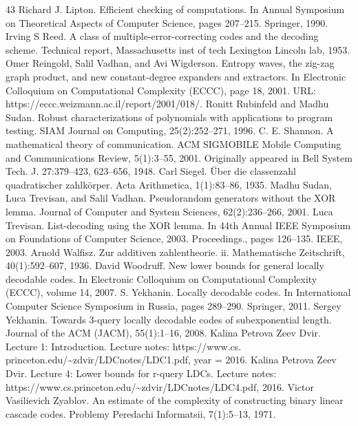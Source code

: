\documentclass[10pt,a4paper]{article}
\begin{document}
\begin{thebibliography}{43}
Richard J. Lipton. Efficient checking of computations. In Annual Symposium on Theoretical Aspects of Computer Science, pages 207–215. Springer, 1990.
Irving S Reed. A class of multiple-error-correcting codes and the decoding scheme. Technical report, Massachusetts inst of tech Lexington Lincoln lab, 1953.
Omer Reingold, Salil Vadhan, and Avi Wigderson. Entropy waves, the zig-zag graph product, and new constant-degree expanders and extractors. In Electronic Colloquium on Computational Complexity (ECCC), page 18, 2001. URL: https://eccc.weizmann.ac.il/report/2001/018/.
Ronitt Rubinfeld and Madhu Sudan. Robust characterizations of polynomials with applications to program testing. SIAM Journal on Computing, 25(2):252–271, 1996.
C. E. Shannon. A mathematical theory of communication. ACM SIGMOBILE Mobile Computing and Communications Review, 5(1):3–55, 2001. Originally appeared in Bell System Tech. J. 27:379–423, 623–656, 1948.
Carl Siegel. Über die classenzahl quadratischer zahlkörper. Acta Arithmetica, 1(1):83–86, 1935.
Madhu Sudan, Luca Trevisan, and Salil Vadhan. Pseudorandom generators without the XOR lemma. Journal of Computer and System Sciences, 62(2):236–266, 2001.
Luca Trevisan. List-decoding using the XOR lemma. In 44th Annual IEEE Symposium on Foundations of Computer Science, 2003. Proceedings., pages 126–135. IEEE, 2003.
Arnold Walfisz. Zur additiven zahlentheorie. ii. Mathematische Zeitschrift, 40(1):592–607, 1936.
David Woodruff. New lower bounds for general locally decodable codes. In Electronic Colloquium on Computational Complexity (ECCC), volume 14, 2007.
S. Yekhanin. Locally decodable codes. In International Computer Science Symposium in Russia, pages 289–290. Springer, 2011.
Sergey Yekhanin. Towards 3-query locally decodable codes of subexponential length. Journal of the ACM (JACM), 55(1):1–16, 2008.
Kalina Petrova Zeev Dvir. Lecture 1: Introduction. Lecture notes: https://www.cs. princeton.edu/\textasciitilde{}zdvir/LDCnotes/LDC1.pdf, year = 2016.
Kalina Petrova Zeev Dvir. Lecture 4: Lower bounds for r-query LDCs. Lecture notes: https://www.cs.princeton.edu/\textasciitilde{}zdvir/LDCnotes/LDC4.pdf, 2016.
Victor Vasilievich Zyablov. An estimate of the complexity of constructing binary linear cascade codes. Problemy Peredachi Informatsii, 7(1):5–13, 1971.
\end{thebibliography}
\end{document}
